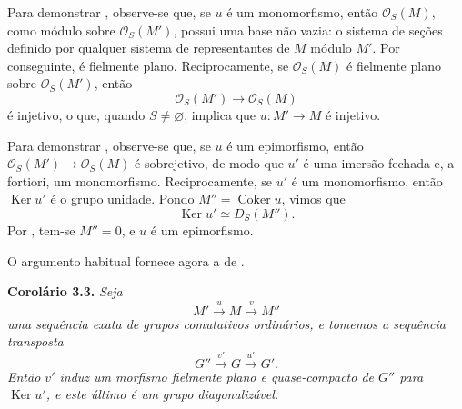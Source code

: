 Para demonstrar ,
observe-se que, se \(u\) é um monomorfismo, então
\(\mathcal O_S(M)\), como módulo sobre \(\mathcal O_S(M')\), possui uma
base não vazia: o sistema de seções definido por qualquer sistema de
representantes de \(M\) módulo \(M'\). Por conseguinte, é fielmente plano.
Reciprocamente, se \(\mathcal O_S(M)\) é fielmente plano sobre
\(\mathcal O_S(M')\), então
\[
  \mathcal O_S(M')\longrightarrow\mathcal O_S(M)
\]
é injetivo, o que, quando \(S\ne\varnothing\), implica que
\(u:M'\to M\) é injetivo.

Para demonstrar ,
observe-se que, se \(u\) é um epimorfismo, então
\(\mathcal O_S(M')\to\mathcal O_S(M)\) é sobrejetivo, de modo que \(u'\)
é uma imersão fechada e, a fortiori, um monomorfismo. Reciprocamente, se
\(u'\) é um monomorfismo, então \(\operatorname{Ker}u'\) é o grupo
unidade. Pondo \(M''=\operatorname{Coker}u\), vimos que
\[
  \operatorname{Ker}u'\simeq D_S(M'').
\]
Por , tem-se
\(M''=0\), e \(u\) é um epimorfismo.

O argumento habitual fornece agora a
 de
.

\medskip
\noindent{}\textbf{Corolário 3.3.}
\textit{Seja}
\[
  M'\xrightarrow{u}M\xrightarrow{v}M''
\]
\textit{uma sequência exata de grupos comutativos ordinários, e tomemos a
sequência transposta}
\[
  G''\xrightarrow{v'}G\xrightarrow{u'}G'.
\]
\textit{Então \(v'\) induz um morfismo fielmente plano e quase-compacto
de \(G''\) para \(\operatorname{Ker}u'\), e este último é um grupo
diagonalizável.}

